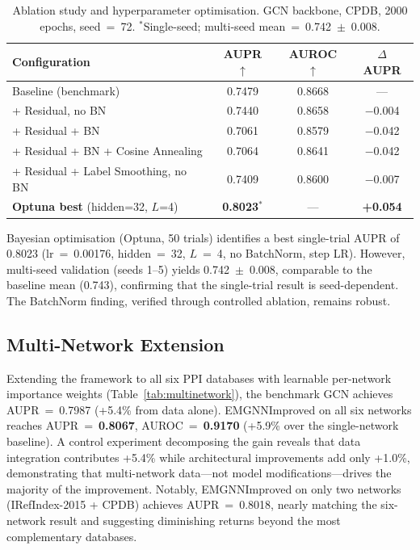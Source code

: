 \begin{table}[ht]
  \centering
  \caption{Ablation study and hyperparameter optimisation. GCN backbone, CPDB, 2000
           epochs, seed~=~72. $^*$Single-seed; multi-seed mean~=~0.742~$\pm$~0.008.}
  \label{tab:ablation}
  \small
  \begin{tabular}{lccc}
    \toprule
    \textbf{Configuration} & \textbf{AUPR $\uparrow$} & \textbf{AUROC $\uparrow$} & \textbf{$\Delta$ AUPR} \\
    \midrule
    Baseline (benchmark)                      & 0.7479 & 0.8668 & ---      \\
    + Residual, no BN                         & 0.7440 & 0.8658 & $-$0.004 \\
    + Residual + BN                           & 0.7061 & 0.8579 & $-$0.042 \\
    + Residual + BN + Cosine Annealing        & 0.7064 & 0.8641 & $-$0.042 \\
    + Residual + Label Smoothing, no BN       & 0.7409 & 0.8600 & $-$0.007 \\
    \midrule
    \textbf{Optuna best} (hidden=32, $L$=4)   & \textbf{0.8023}$^*$ & --- & \textbf{+0.054} \\
    \bottomrule
  \end{tabular}
\end{table}

Bayesian optimisation (Optuna, 50 trials) identifies a best single-trial AUPR of
0.8023 (lr~=~0.00176, hidden~=~32, $L$~=~4, no BatchNorm, step LR). However,
multi-seed validation (seeds 1--5) yields 0.742~$\pm$~0.008, comparable to the
baseline mean (0.743), confirming that the single-trial result is seed-dependent.
The BatchNorm finding, verified through controlled ablation, remains robust.

\subsection{Multi-Network Extension}

Extending the framework to all six PPI databases with learnable per-network
importance weights (Table~\ref{tab:multinetwork}), the benchmark GCN achieves
AUPR~=~0.7987 (+5.4\% from data alone). EMGNNImproved on all six networks reaches
AUPR~=~\textbf{0.8067}, AUROC~=~\textbf{0.9170} (+5.9\% over the single-network
baseline). A control experiment decomposing the gain reveals that data integration
contributes +5.4\% while architectural improvements add only +1.0\%, demonstrating
that multi-network data---not model modifications---drives the majority of the
improvement. Notably, EMGNNImproved on only two networks (IRefIndex-2015 + CPDB)
achieves AUPR~=~0.8018, nearly matching the six-network result and suggesting
diminishing returns beyond the most complementary databases.

